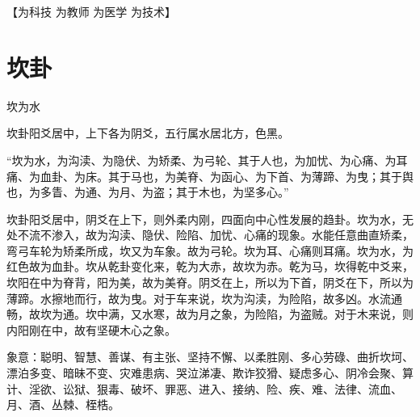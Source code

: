 \documentclass[12pt,oneside]{book}
\begin{document}
【为科技 为教师 为医学 为技术】


\section{坎卦}
坎为水

坎卦阳爻居中，上下各为阴爻，五行属水居北方，色黑。

“坎为水，为沟渎、为隐伏、为矫柔、为弓轮、其于人也，为加忧、为心痛、为耳痛、为血卦、为床。其于马也，为美脊、为函心、为下首、为薄蹄、为曳；其于舆也，为多眚、为通、为月、为盗；其于木也，为坚多心。”

坎卦阳爻居中，阴爻在上下，则外柔内刚，四面向中心性发展的趋卦。坎为水，无处不流不渗入，故为沟渎、隐伏、险陷、加忧、心痛的现象。水能任意曲直矫柔，弯弓车轮为矫柔所成，坎又为车象。故为弓轮。坎为耳、心痛则耳痛。坎为水，为红色故为血卦。坎从乾卦变化来，乾为大赤，故坎为赤。乾为马，坎得乾中爻来，坎阳在中为脊背，阳为美，故为美脊。阴爻在上，所以为下首，阴爻在下，所以为薄蹄。水擦地而行，故为曳。对于车来说，坎为沟渎，为险陷，故多凶。水流通畅，故坎为通。坎中满，又水寒，故为月之象，为险陷，为盗贼。对于木来说，则内阳刚在中，故有坚硬木心之象。

象意：聪明、智慧、善谋、有主张、坚持不懈、以柔胜刚、多心劳碌、曲折坎坷、漂泊多变、暗昧不变、灾难患病、哭泣涕凄、欺诈狡猾、疑虑多心、阴冷会聚、算计、淫欲、讼狱、狠毒、破坏、罪恶、进入、接纳、险、疾、难、法律、流血、月、酒、丛棘、桎梏。
\end{document}
